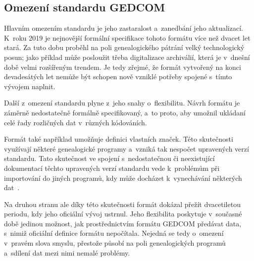 		\subsection*{Omezení standardu GEDCOM}
		Hlavním omezením standardu je jeho zastaralost a~zanedbání jeho aktualizací. K~roku 2019 je nejnovější formální specifikace tohoto formátu více než dvacet let stará. Za tuto dobu proběhl na poli genealogického pátrání velký technologický posun; jako příklad může posloužit třeba digitalizace archiválií, která je v~dnešní době velmi rozšířeným trendem. Je tedy zřejmé, že formát vytvořený na konci devadesátých let nemůže být schopen nově vzniklé potřeby spojené s~tímto vývojem naplnit. \par
		Další z~omezení standardu plyne z~jeho snahy o~flexibilitu. Návrh formátu je záměrně nedostatečně formálně specifikovaný, a~to proto, aby umožnil ukládaní celé řady rozličných dat v~různých kódováních. \par
		Formát také například umožňuje definici vlastních značek. Této skutečnosti využívají některé genealogické programy a~vzniká tak nespočet upravených verzí standardu. Tato skutečnost ve spojení s~nedostatečnou či neexistující dokumentací těchto upravených verzí standardu vede k~problémům při importování do jiných programů, kdy může docházet k~vynechávání některých dat~\cite{bib:GedcomNoSynch}. \par
		Na druhou stranu ale díky této skutečnosti formát dokázal přežít dvacetiletou periodu, kdy jeho oficiální vývoj ustrnul. Jeho flexibilita poskytuje v~současné době jedinou možnost, jak prostřednictvím formátu GEDCOM předávat data, s~nimiž oficiální definice formátu nepočítala. Nejedná se tedy o~omezení v~pravém slova smyslu, přestože působí na poli genealogických programů a~sdílení dat mezi nimi nemalé problémy. \par
		
